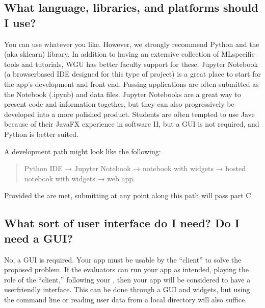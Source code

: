 \documentclass[letterpaper,10pt,english]{jupyterBook}
\begin{document}
\subsection{What language, libraries, and platforms should I use?}
\label{\detokenize{task2_c/task2_part_c:what-language-libraries-and-platforms-should-i-use}}
\sphinxAtStartPar
You can use whatever you like. However, we strongly recommend Python and the  (aka sklearn) library. In addition to having an extensive collection of ML\sphinxhyphen{}specific tools and tutorials, WGU has better faculty support for these. Jupyter Notebook (a browser\sphinxhyphen{}based IDE designed for this type of project) is a great place to start for the app’s development and front end. Passing applications are often submitted as the Notebook (.ipynb) and data files. Jupyter Notebooks are a great way to present code and information together, but they can also progressively be developed into a more polished product. Students are often tempted to use Jave because of their JavaFX experience in software II, but a GUI is not required, and Python is better suited.

\sphinxAtStartPar
A development path might look like the following:
\begin{quote}

\sphinxAtStartPar
Python IDE → Jupyter Notebook → notebook with widgets → hosted notebook with widgets → web app.
\end{quote}

\sphinxAtStartPar
Provided the  are met, submitting at any point along this path will pass part C.


\subsection{What sort of user interface do I need? Do I need a GUI?}
\label{\detokenize{task2_c/task2_part_c:what-sort-of-user-interface-do-i-need-do-i-need-a-gui}}
\sphinxAtStartPar
No, a GUI is  required. Your app must be usable by the “client” to solve the proposed problem. If the evaluators can run your app as intended, playing the role of the “client,” following your {\hyperref[\detokenize{task2_doc/task2_doc_d:task2-doc-d-user-guide}]{}}, then your app will be considered to have a user\sphinxhyphen{}friendly interface. This can be done through a GUI and widgets, but using the command line or reading user data from a local directory will also suffice.
\end{document}
